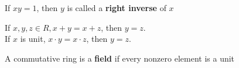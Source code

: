 \begin{remark}
    If  $ xy=1 $, then  $ y  $ is called a \textbf{right inverse} of  $ x $ 
\end{remark}
\begin{proposition}
    If  $ x,y,z\in R,x+y=x+z $, then  $ y=z  $.\\
    If  $ x  $ is unit, $ x\cdot y=x\cdot z  $, then  $ y=z  $. 
\end{proposition}
\begin{definition}[Field]
    A commutative ring is a \textbf{field} if every nonzero element is a unit
\end{definition}